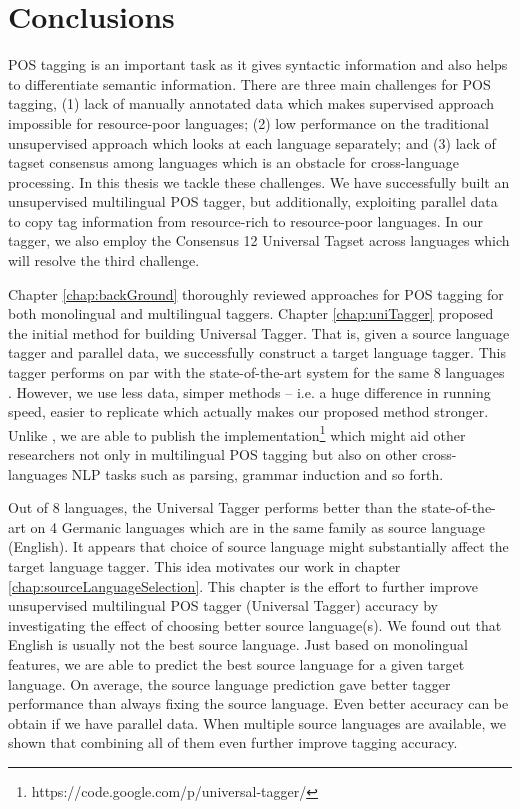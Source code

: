 
\chapter{Conclusions}

\label{chap:conclusion}
POS tagging is an important task as it gives syntactic information and also helps to differentiate semantic information. There are three main challenges for POS tagging, (1) lack of manually annotated data which makes supervised approach impossible for resource-poor languages; (2) low performance on the traditional unsupervised approach which looks at each language separately; and (3) lack of tagset consensus among languages which is an obstacle for cross-language processing. In this thesis we tackle these challenges. We have successfully built an unsupervised multilingual POS tagger, but additionally, exploiting parallel data to copy tag information from resource-rich to resource-poor languages. In our tagger, we also employ the Consensus 12 Universal Tagset across languages which will resolve the third challenge. 

Chapter \ref{chap:backGround} thoroughly reviewed approaches for POS tagging for both monolingual and multilingual taggers. Chapter \ref{chap:uniTagger} proposed the initial method for building Universal Tagger. That is, given a source language tagger and parallel data, we successfully construct a target language tagger. This tagger performs on par with the state-of-the-art system for the same 8 languages \cite{Das:2011}. However, we use less data, simper methods -- i.e. a huge difference in running speed, easier to replicate which actually makes our proposed method stronger. Unlike , we are able to publish the implementation\footnote{https://code.google.com/p/universal-tagger/} which might aid other researchers not only in multilingual POS tagging but also on other cross-languages NLP tasks such as parsing, grammar induction and so forth. 

Out of 8 languages, the  Universal Tagger performs better than the state-of-the-art on 4 Germanic languages which are in the same family as source language (English). It appears that choice of source language might substantially affect the target language tagger. This idea motivates our work in chapter \ref{chap:sourceLanguageSelection}. This chapter is the effort to further improve unsupervised multilingual POS tagger (Universal Tagger) accuracy by investigating the effect of choosing better source language(s). We found out that English is usually not the best source language.  Just based on monolingual features, we are able to predict the best source language for a given target language. On average, the source language prediction gave better tagger performance than always fixing the source language. Even better accuracy can be obtain if we have parallel data. When multiple source languages are available, we shown that combining all of them even further improve tagging accuracy. 

